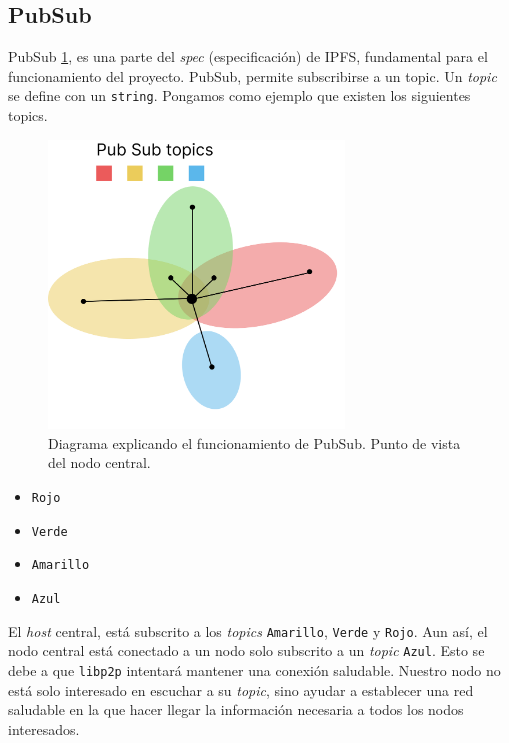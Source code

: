 \subsection{PubSub}
PubSub \ref{fg:PubSub}, es una parte del \textit{spec} (especificación) de IPFS, fundamental para el funcionamiento del proyecto.
PubSub, permite subscribirse a un topic. Un \textit{topic} se define con un \verb|string|.
Pongamos como ejemplo que existen los siguientes topics.
\begin{figure}[h!]
    \centering
    \includegraphics[width=0.7\textwidth]{Figures/Pub Sub.png}
    \caption{Diagrama explicando el funcionamiento de PubSub. Punto de vista del nodo central.}
    \label{fg:PubSub}
\end{figure}
\begin{itemize}
    \item \verb|Rojo|
    \item \verb|Verde|
    \item \verb|Amarillo|
    \item \verb|Azul|
\end{itemize}
El \textit{host} central, está subscrito a los \textit{topics} \verb|Amarillo|, \verb|Verde| y \verb|Rojo|.  Aun así, el nodo central está conectado a un nodo solo subscrito a un \textit{topic} \verb|Azul|. Esto se debe a que \verb|libp2p| intentará mantener una conexión saludable. Nuestro nodo no está solo interesado en escuchar a su \textit{topic}, sino ayudar a establecer una red saludable en la que hacer llegar la información necesaria a todos los nodos interesados.
